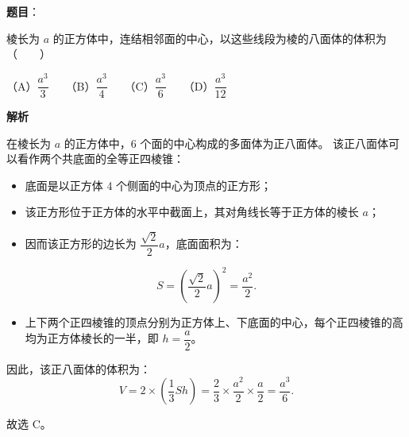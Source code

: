 \begin{answer}

\textbf{题目}：

棱长为 $a$ 的正方体中，连结相邻面的中心，以这些线段为棱的八面体的体积为\mbox{（　　）}

（A）$\dfrac{a^3}{3}$　　（B）$\dfrac{a^3}{4}$　　（C）$\dfrac{a^3}{6}$　　（D）$\dfrac{a^3}{12}$

\textbf{解析}

在棱长为 $a$ 的正方体中，6 个面的中心构成的多面体为正八面体。
该正八面体可以看作两个共底面的全等正四棱锥：
\begin{itemize}
\item 底面是以正方体 4 个侧面的中心为顶点的正方形；
\item 该正方形位于正方体的水平中截面上，其对角线长等于正方体的棱长 $a$；
\item 因而该正方形的边长为 $\dfrac{\sqrt{2}}{2}a$，底面面积为：
\end{itemize}
\nopagebreak[4]
\[S = \left(\frac{\sqrt{2}}{2}a\right)^2 = \frac{a^2}{2}.\]
\begin{itemize}
\item 上下两个正四棱锥的顶点分别为正方体上、下底面的中心，每个正四棱锥的高均为正方体棱长的一半，即 $h = \dfrac{a}{2}$。
\end{itemize}
因此，该正八面体的体积为：
\nopagebreak[4]
\[V = 2 \times \left(\frac{1}{3} S h\right) = \frac{2}{3} \times \frac{a^2}{2} \times \frac{a}{2} = \frac{a^3}{6}.\]

故选 C。


\end{answer}
